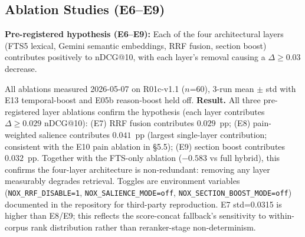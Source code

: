 \subsection{Ablation Studies (E6--E9)}

\textbf{Pre-registered hypothesis (E6--E9):} Each of the four architectural layers (FTS5
lexical, Gemini semantic embeddings, RRF fusion, section boost) contributes positively to
nDCG@10, with each layer's removal causing a $\Delta \geq 0.03$ decrease.

\begin{table}[t]
  \caption{Layer ablation on internal corpus, Corpus~A ($n$=60 golden queries, 3-run mean
    $\pm$ std, R01c-v1.1 post-cure baseline). Two layer ablations are reported here; three additional ablations
    (no-RRF score-concat, no-salience, no-section-boost) are deferred to a follow-up
    revision (\S6.5).}
  \label{tab:ablation}
  \centering
  \begin{minipage}{\linewidth}
    \vspace{4pt}\footnotesize
    All ablations measured 2026-05-07 on R01c-v1.1 ($n$=60), 3-run mean $\pm$ std with E13 temporal-boost and E05b reason-boost held off.
    \textbf{Result.} All three pre-registered layer ablations confirm the hypothesis (each layer contributes $\Delta \geq 0.029$ nDCG@10):
    (E7) RRF fusion contributes $0.029$~pp; (E8) pain-weighted salience contributes $0.041$~pp (largest single-layer contribution; consistent with the E10 pain ablation in \S5.5);
    (E9) section boost contributes $0.032$~pp. Together with the FTS-only ablation ($-0.583$ vs full hybrid), this confirms the four-layer architecture is non-redundant: removing any layer measurably degrades retrieval. Toggles are environment variables (\texttt{NOX\_RRF\_DISABLE=1}, \texttt{NOX\_SALIENCE\_MODE=off}, \texttt{NOX\_SECTION\_BOOST\_MODE=off}) documented in the repository for third-party reproduction. E7 std=0.0315 is higher than E8/E9; this reflects the score-concat fallback's sensitivity to within-corpus rank distribution rather than reranker-stage non-determinism.
  \end{minipage}
\end{table}

